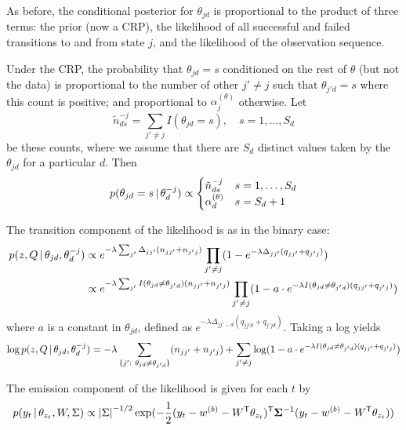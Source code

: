 As before, the conditional posterior for $\theta_{jd}$ 
is proportional to the product of three terms: the prior (now a CRP),
the likelihood of all successful and failed transitions to and from
state $j$, and the likelihood of the observation sequence.

Under the CRP, the probability that $\theta_{jd} = s$ conditioned on the rest of $\theta$ (but not the data) is proportional to the number of other $j' \neq j$ such that
$\theta_{j'd} = s$ where this count is positive; and proportional to
$\alpha_j^{(\theta)}$ otherwise.  Let 
\begin{equation}
\tilde{n}^{-j}_{ds} = \sum_{j' \neq j} I(\theta_{jd} = s), \quad s = 1,
\dots, S_d
\end{equation}
be these counts, where we assume that there are $S_d$ distinct values
taken by the $\theta_{jd}$ for a particular $d$.  Then
\begin{equation}
  p(\theta_{jd} = s \, \vert \, \theta_{d}^{-j}) \propto
\begin{cases}
\tilde{n}^{-j}_{ds} & s = 1, \dots, S_d \\
\alpha_{d}^{(\theta)} & s = S_d + 1
\end{cases}
\end{equation}

The transition component of the likelihood is as in the binary case:
\begin{align}
  p(z, Q \, \vert \, \theta_{jd}, \theta_{d}^{-j}) & \propto
  e^{-\lambda\sum_{j'} \Delta_{jj'} (n_{jj'} + n_{j'j})} \prod_{j'
    \neq j} (1 - e^{-\lambda\Delta_{jj'} (q_{jj'} + q_{j'j})})\\
  &\propto e^{-\lambda \sum_{j'} I(\theta_{jd} \neq \theta_{j'd})
    (n_{jj'} + n_{j'j})} \prod_{j'
    \neq j} (1 - a\cdot e^{-\lambda I(\theta_{jd} \neq \theta_{j'd}) (q_{jj'} + q_{j'j})})
\end{align}
where $a$ is a constant in $\theta_{jd}$, defined as $e^{-\lambda
  \Delta_{jj'-d} (q_{jj'd} + q_{j'jd})}$.  Taking a log yields
\begin{equation}
  \log p(z, Q \, \vert \, \theta_{jd}, \theta_{d}^{-j}) =
  -\lambda \sum_{\{j':\ \theta_{jd} \neq \theta_{j'd}\}} (n_{jj'} +
  n_{j'j}) + \sum_{j'
    \neq j} \log(1 - a\cdot e^{-\lambda I(\theta_{jd} \neq \theta_{j'd}) (q_{jj'} + q_{j'j})})
\end{equation}

The emission component of the likelihood is given for each $t$ by
\begin{equation}
  p(y_t \, \vert \, \theta_{z_t}, W, \Sigma) \propto \left\vert \Sigma \right\vert^{-1/2}
  \exp(-\frac{1}{2} (y_t - w^{(b)} -
  W^{\sf T} \theta_{z_t})^{\sf T}\boldsymbol{\Sigma}^{-1}(y_t - w^{(b)} - W^{\sf T} \theta_{z_t}))
\end{equation}

